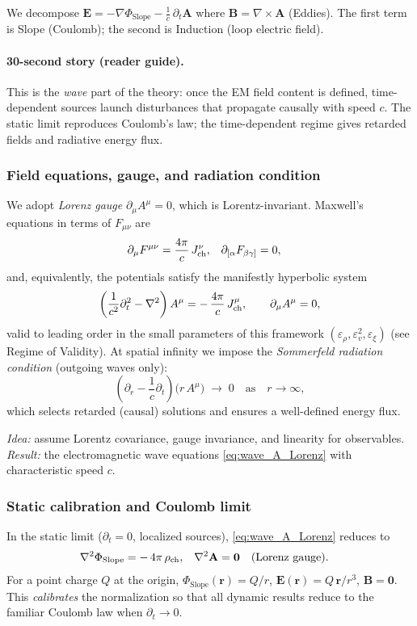 We decompose $\mathbf E = -\nabla \Phi_{\text{Slope}} - \tfrac{1}{c}\,\partial_t \mathbf A$ where $\mathbf B=\nabla\times\mathbf A$ (Eddies). The first term is Slope (Coulomb); the second is Induction (loop electric field).

\paragraph{30-second story (reader guide).}
This is the \emph{wave} part of the theory: once the EM field content is defined,
time-dependent sources launch disturbances that propagate causally with speed \(c\).
The static limit reproduces Coulomb's law; the time-dependent regime gives retarded fields and radiative energy flux.

\subsubsection{Field equations, gauge, and radiation condition}
We adopt \emph{Lorenz gauge} \(\partial_\mu A^\mu=0\), which is Lorentz-invariant.
Maxwell's equations in terms of \(F_{\mu\nu}\) are
\begin{align}
\partial_\mu F^{\mu\nu} &= \frac{4\pi}{c}\,J^\nu_{\rm ch}, &
\partial_{[\alpha}F_{\beta\gamma]} &= 0,
\end{align}
and, equivalently, the potentials satisfy the manifestly hyperbolic system
\begin{equation}
\left(\frac{1}{c^2}\partial_t^2-\nabla^2\right) A^\mu
= -\,\frac{4\pi}{c}\,J^\mu_{\rm ch}, \qquad \partial_\mu A^\mu=0,
\label{eq:wave_A_Lorenz}
\end{equation}
valid to leading order in the small parameters of this framework
\((\varepsilon_\rho,\varepsilon_v^2,\varepsilon_\xi)\) (see Regime of Validity).
At spatial infinity we impose the \emph{Sommerfeld radiation condition} (outgoing waves only):
\begin{equation}
\left(\partial_r - \frac{1}{c}\partial_t\right)\!\big(r\,A^\mu\big) \;\to\; 0
\quad \text{as}\quad r\to\infty,
\end{equation}
which selects retarded (causal) solutions and ensures a well-defined energy flux.

\noindent\emph{Idea:} assume Lorentz covariance, gauge invariance, and linearity for observables. \;
\emph{Result:} the electromagnetic wave equations \eqref{eq:wave_A_Lorenz} with characteristic speed \(c\).

\subsubsection{Static calibration and Coulomb limit}
In the static limit (\(\partial_t=0\), localized sources), \eqref{eq:wave_A_Lorenz} reduces to
\begin{align}
\nabla^2 \Phi_{\text{Slope}} &= -\,4\pi\,\rho_{\rm ch}, &
\nabla^2 \mathbf A &= \mathbf 0 \quad (\text{Lorenz gauge}).
\end{align}
For a point charge \(Q\) at the origin,
\(\Phi_{\text{Slope}}(\mathbf r)= Q/r\), \(\mathbf E(\mathbf r)= Q\,\mathbf r/r^3\), \(\mathbf B=\mathbf 0\).
This \emph{calibrates} the normalization so that all dynamic results reduce to the familiar Coulomb law when \(\partial_t\to0\).

